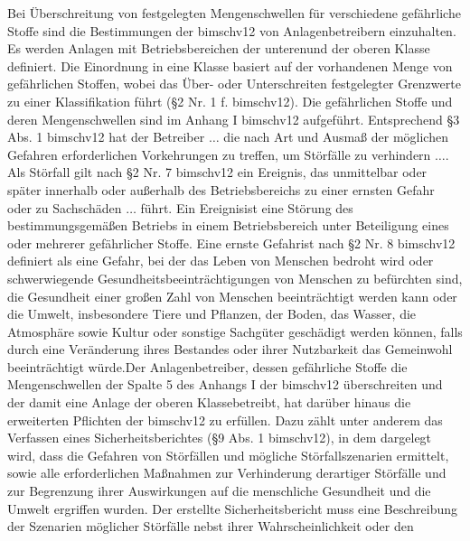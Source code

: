 Bei \"Uberschreitung von festgelegten Mengenschwellen f\"ur verschiedene gef\"ahrliche Stoffe sind die Bestimmungen der \ac{bimschv12} von Anlagenbetreibern einzuhalten. Es werden Anlagen mit Betriebsbereichen \glqq der unteren\grqq { }und \glqq der oberen Klasse definiert. Die Einordnung in eine Klasse basiert auf der vorhandenen Menge von gef\"ahrlichen Stoffen, wobei das {\"Uber- oder Unterschreiten} festgelegter Grenzwerte zu einer Klassifikation f\"uhrt {(\S 2 Nr. 1 f. \ac{bimschv12})}. Die gef\"ahrlichen Stoffe und deren Mengenschwellen sind im {Anhang I \ac{bimschv12}} aufgef\"uhrt. Entsprechend {\S 3 Abs. 1 \ac{bimschv12}} hat der Betreiber \glqq $\dots$ die nach Art und Ausma\ss{} der m\"oglichen Gefahren erforderlichen Vorkehrungen zu treffen, um St\"orf\"alle zu verhindern $\dots$\grqq { }. Als St\"orfall gilt nach {\S 2 Nr. 7 \ac{bimschv12}} \glqq ein Ereignis, das unmittelbar oder sp\"ater innerhalb oder au\ss{}erhalb des Betriebsbereichs zu einer ernsten Gefahr oder zu Sachsch\"aden $\dots$ f\"uhrt\grqq { }. Ein \glqq Ereignis\grqq { }ist eine \glqq St\"orung des bestimmungsgem\"a\ss{}en Betriebs in einem Betriebsbereich unter Beteiligung eines oder mehrerer gef\"ahrlicher Stoffe. Eine \glqq ernste Gefahr\grqq { }ist nach {\S 2 Nr. 8 \ac{bimschv12}} definiert als \glqq eine Gefahr, bei der das Leben von Menschen bedroht wird oder schwerwiegende Gesundheitsbeeintr\"achtigungen von Menschen zu bef\"urchten sind, die Gesundheit einer gro\ss{}en Zahl von Menschen beeintr\"achtigt werden kann oder die Umwelt, insbesondere Tiere und Pflanzen, der Boden, das Wasser, die Atmosph\"are sowie Kultur oder sonstige Sachg\"uter gesch\"adigt werden k\"onnen, falls durch eine Ver\"anderung ihres Bestandes oder ihrer Nutzbarkeit das Gemeinwohl beeintr\"achtigt w\"urde.\grqq { }Der Anlagenbetreiber, dessen gef\"ahrliche Stoffe die Mengenschwellen der Spalte 5 des Anhangs I der \ac{bimschv12} \"uberschreiten und der damit eine Anlage der \glqq oberen Klasse\grqq { }betreibt, hat dar\"uber hinaus die erweiterten Pflichten der \ac{bimschv12} zu erf\"ullen. Dazu z\"ahlt unter anderem das Verfassen eines Sicherheitsberichtes {(\S 9 Abs. 1 \ac{bimschv12})}, in dem dargelegt wird, dass \glqq die Gefahren von St\"orf\"allen und m\"ogliche St\"orfallszenarien ermittelt, sowie alle erforderlichen Ma\ss{}nahmen zur Verhinderung derartiger St\"orf\"alle und zur Begrenzung ihrer Auswirkungen auf die menschliche Gesundheit und die Umwelt ergriffen wurden. Der erstellte Sicherheitsbericht muss eine \glqq Beschreibung der Szenarien m\"oglicher St\"orf\"alle nebst ihrer Wahrscheinlichkeit oder den
